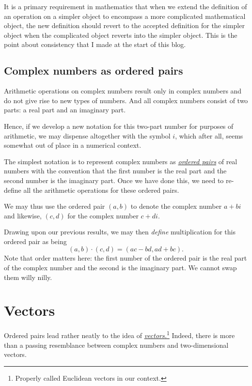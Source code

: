 \documentclass[
  a4paper,
]{article}
\begin{document}
It is a primary requirement in mathematics that when we extend the
definition of an operation on a simpler object to encompass a more
complicated mathematical object, the new definition should revert to the
accepted definition for the simpler object when the complicated object
reverts into the simpler object. This is the point about consistency
that I made at the start of this blog.

\hypertarget{complex-numbers-as-ordered-pairs}{%
\subsection{Complex numbers as ordered
pairs}\label{complex-numbers-as-ordered-pairs}}

Arithmetic operations on complex numbers result only in complex numbers
and do not give rise to new types of numbers. And all complex numbers
consist of two parts: a real part and an imaginary part.

Hence, if we develop a new notation for this two-part number for
purposes of arithmetic, we may dispense altogether with the symbol
\(i\), which after all, seems somewhat out of place in a numerical
context.

The simplest notation is to represent complex numbers as
\href{http://www.mathsisfun.com/definitions/ordered-pair.html}{\emph{ordered
pairs}} of real numbers with the convention that the first number is the
real part and the second number is the imaginary part. Once we have done
this, we need to re-define all the arithmetic operations for these
ordered pairs.

We may thus use the ordered pair \((a, b)\) to denote the complex number
\(a + bi\) and likewise, \((c, d)\) for the complex number \(c + di\).

Drawing upon our previous results, we may then \emph{define}
multiplication for this ordered pair as being \[
(a, b)\cdot(c, d) = (ac - bd, ad + bc).
\] Note that order matters here: the first number of the ordered pair is
the real part of the complex number and the second is the imaginary
part. We cannot swap them willy nilly.

\hypertarget{vectors}{%
\section{Vectors}\label{vectors}}

Ordered pairs lead rather neatly to the idea of
\href{http://en.wikipedia.org/wiki/Euclidean_vector}{\emph{vectors.}}\footnote{Properly
  called Euclidean vectors in our context.} Indeed, there is more than a
passing resemblance between complex numbers and two-dimensional vectors.
\end{document}
